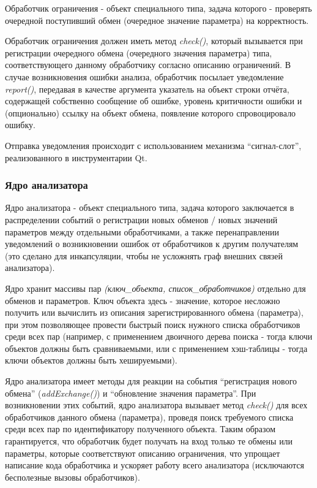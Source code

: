Обработчик ограничения - объект специального типа, задача которого - проверять 
очередной поступивший обмен (очередное значение параметра) на корректность.

Обработчик ограничения должен иметь метод \textit{check()}, который вызывается 
при регистрации очередного обмена (очередного значения параметра) типа, 
соответствующего данному обработчику согласно описанию ограничений. В случае 
возникновения ошибки анализа, обработчик посылает уведомление 
\textit{report()}, передавая в качестве аргумента указатель на объект строки 
отчёта, содержащей собственно сообщение об ошибке, уровень критичности ошибки и 
(опционально) ссылку на объект обмена, появление которого спровоцировало ошибку.

Отправка уведомления происходит с использованием механизма ``сигнал-слот'', 
реализованного в инструментарии Qt.

\subsubsection{Ядро анализатора}

Ядро анализатора - объект специального типа, задача которого заключается в 
распределении событий о регистрации новых обменов / новых значений параметров 
между отдельными обработчиками, а также перенаправлении уведомлений о 
возникновении ошибок от обработчиков к другим получателям (это сделано для 
инкапсуляции, чтобы не усложнять граф внешних связей анализатора).

Ядро хранит массивы пар \textit{(ключ\_объекта, список\_обработчиков)} 
отдельно для обменов и параметров. Ключ объекта здесь - значение, которое 
несложно получить или вычислить из описания зарегистрированного обмена 
(параметра), при этом позволяющее провести быстрый поиск нужного списка 
обработчиков среди всех пар (например, с применением двоичного дерева поиска - 
тогда ключи объектов должны быть сравниваемыми, или с применением хэш-таблицы - 
тогда ключи объектов должны быть хешируемыми).

Ядро анализатора имеет методы для реакции на события ``регистрация нового 
обмена'' (\textit{addExchange()}) и ``обновление значения параметра''. При 
возникновении этих событий, ядро анализатора вызывает метод \textit{check()} 
для 
всех обработчиков данного обмена (параметра), проведя поиск требуемого списка 
среди всех пар по идентификатору полученного объекта. Таким 
образом гарантируется, что обработчик будет получать на вход только те обмены 
или параметры, которые соответствуют описанию ограничения, что упрощает 
написание кода обработчика и ускоряет работу всего анализатора 
(исключаются бесполезные вызовы обработчиков).

